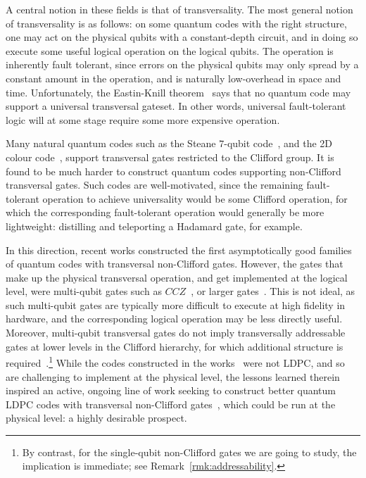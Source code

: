 \documentclass{article}
\newcounter{main}[section]
\begin{document}
A central notion in these fields is that of transversality. The most general notion of transversality is as follows: on some quantum codes with the right structure, one may act on the physical qubits with a constant-depth circuit, and in doing so execute some useful logical operation on the logical qubits. The operation is inherently fault tolerant, since errors on the physical qubits may only spread by a constant amount in the operation, and is naturally low-overhead in space and time. Unfortunately, the Eastin-Knill theorem~\cite{eastin2009restrictions} says that no quantum code may support a universal transversal gateset. In other words, universal fault-tolerant logic will at some stage require some more expensive operation.

Many natural quantum codes such as the Steane $7$-qubit code~\cite{steane1996error}, and the 2D colour code~\cite{bombin2006topological}, support transversal gates restricted to the Clifford group. It is found to be much harder to construct quantum codes supporting non-Clifford transversal gates. Such codes are well-motivated, since the remaining fault-tolerant operation to achieve universality would be some Clifford operation, for which the corresponding fault-tolerant operation would generally be more lightweight: distilling and teleporting a Hadamard gate, for example.

In this direction, recent works constructed the first asymptotically good families of quantum codes with transversal non-Clifford gates. However, the gates that make up the physical transversal operation, and get implemented at the logical level, were multi-qubit gates such as $CCZ$~\cite{golowich2025asymptotically,nguyen2024good}, or larger gates~\cite{wills2024}. This is not ideal, as such multi-qubit gates are typically more difficult to execute at high fidelity in hardware, and the corresponding logical operation may be less directly useful. Moreover, multi-qubit transversal gates do not imply transversally addressable gates at lower levels in the Clifford hierarchy, for which additional structure is required~\cite{he2025quantum,he2025asymptotically}.\footnote{By contrast, for the single-qubit non-Clifford gates we are going to study, the implication is immediate; see Remark~\ref{rmk:addressability}.} While the codes constructed in the works~\cite{wills2024,golowich2025asymptotically,nguyen2024good} were not LDPC, and so are challenging to implement at the physical level, the lessons learned therein inspired an active, ongoing line of work seeking to construct better quantum LDPC codes with transversal non-Clifford gates~\cite{golowich2025quantum,scruby2024quantum,zhu2025transversal,golowich2025near,zhu2025non,zhu2026non,kobayashi2026clifford,breuckmann2026cups,li2025poincar,li2026transversal}, which could be run at the physical level: a highly desirable prospect.
\end{document}
